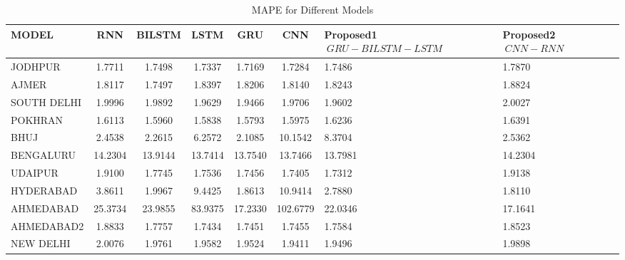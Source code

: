 \documentclass[a4paper,fleqn]{cas-sc}
\begin{document}
\begin{table}[!ht]
\centering
\caption{MAPE  for Different Models}
\begin{tabular}{|l|c|c|c|c|c|p{}|p{}|}
\hline
\textbf{MODEL} & \textbf{RNN} & \textbf{BILSTM} & \textbf{LSTM} & \textbf{GRU} & \textbf{CNN} &\textbf{Proposed1 \(\ GRU-BILSTM-LSTM \)\ } & \textbf{Proposed2 \(\ CNN-RNN\)\ } \\ \hline
JODHPUR & 1.7711 & 1.7498 & 1.7337 & 1.7169 & 1.7284 & 1.7486 & 1.7870 \\ \hline
AJMER & 1.8117 & 1.7497 & 1.8397 & 1.8206 & 1.8140 & 1.8243 & 1.8824 \\ \hline
SOUTH DELHI & 1.9996 & 1.9892 & 1.9629 & 1.9466 & 1.9706 & 1.9602 & 2.0027 \\ \hline
POKHRAN & 1.6113 & 1.5960 & 1.5838 & 1.5793 & 1.5975 & 1.6236 & 1.6391 \\ \hline
BHUJ & 2.4538 & 2.2615 & 6.2572 & 2.1085 & 10.1542 & 8.3704 & 2.5362 \\ \hline
BENGALURU & 14.2304 & 13.9144 & 13.7414 & 13.7540 & 13.7466 & 13.7981 & 14.2304 \\ \hline
UDAIPUR & 1.9100 & 1.7745 & 1.7536 & 1.7456 & 1.7405 & 1.7312 & 1.9138 \\ \hline
HYDERABAD & 3.8611 & 1.9967 & 9.4425 & 1.8613 & 10.9414 & 2.7880 & 1.8110 \\ \hline
AHMEDABAD & 25.3734 & 23.9855 & 83.9375 & 17.2330 & 102.6779 & 22.0346 & 17.1641 \\ \hline
AHMEDABAD2 & 1.8833 & 1.7757 & 1.7434 & 1.7451 & 1.7455 & 1.7584 & 1.8523 \\ \hline
NEW DELHI & 2.0076 & 1.9761 & 1.9582 & 1.9524 & 1.9411 & 1.9496 & 1.9898 \\ \hline
\end{tabular}
\end{table}
\end{document}
